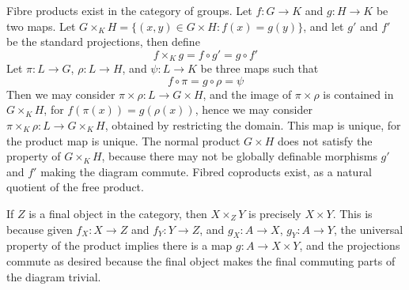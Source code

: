 \begin{example}
    Fibre products exist in the category of groups. Let $f: G \to K$ and $g: H \to K$ be two maps. Let $G \times_K H = \{ (x,y) \in G \times H : f(x) = g(y) \}$, and let $g'$ and $f'$ be the standard projections, then define
    \[ f \times_K g = f \circ g' = g \circ f' \]
    Let $\pi: L \to G$, $\rho: L \to H$, and $\psi: L \to K$ be three maps such that
    \[ f \circ \pi = g \circ \rho = \psi \]
    Then we may consider $\pi \times \rho: L \to G \times H$, and the image of $\pi \times \rho$ is contained in $G \times_K H$, for $f(\pi(x)) = g(\rho(x))$, hence we may consider $\pi \times_K \rho: L \to G \times_K H$, obtained by restricting the domain. This map is unique, for the product map is unique. The normal product $G \times H$ does not satisfy the property of $G \times_K H$, because there may not be globally definable morphisms $g'$ and $f'$ making the diagram commute. Fibred coproducts exist, as a natural quotient of the free product.
\end{example}

\begin{example}
    If $Z$ is a final object in the category, then $X \times_Z Y$ is precisely $X \times Y$. This is because given $f_X: X \to Z$ and $f_Y: Y \to Z$, and $g_X: A \to X$, $g_Y: A \to Y$, the universal property of the product implies there is a map $g: A \to X \times Y$, and the projections commute as desired because the final object makes the final commuting parts of the diagram trivial.
\end{example}

